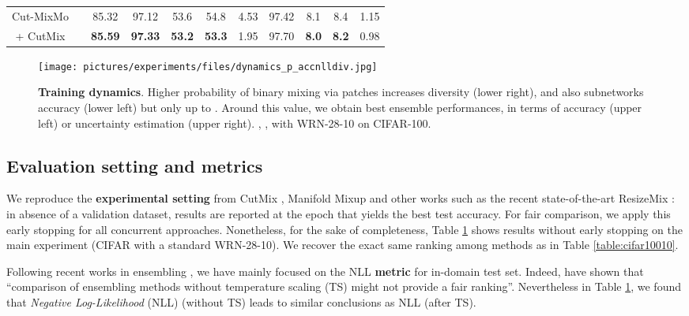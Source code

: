 \documentclass[10pt,twocolumn,letterpaper]{article}
\begin{document}
\begin{table}[!t]
{\begin{tabular}{c | c | c c c c c | c c c c}
        \multirow{1}{*}{Cut-MixMo} &  & 85.32 & 97.12 & 53.6& 54.8 & 4.53 & 97.42 & 8.1& 8.4 & 1.15 \\
        + CutMix & & \textbf{85.59} & \textbf{97.33} & \textbf{53.2} & \textbf{53.3} & 1.95 & 97.70 & \textbf{8.0} & \textbf{8.2} & 0.98 \\
        \bottomrule \end{tabular}}\label{table:cifar10010end}\end{table} \begin{figure*}[!ht]
\centering
\texttt{[image: pictures/experiments/files/dynamics\_p\_accnlldiv.jpg]}
\caption{\textbf{Training dynamics}. Higher probability  of binary mixing via patches increases diversity (lower right), and also subnetworks accuracy (lower left) but only up to . Around this value, we obtain best ensemble performances, in terms of accuracy (upper left) or uncertainty estimation (upper right). , ,  with WRN-28-10 on CIFAR-100.}
\label{fig:dynamicsp}
\end{figure*} 

\subsection{Evaluation setting and metrics}
\label{app:expeeval}
We reproduce the \textbf{experimental setting} from CutMix
\cite{yun2019cutmix}, Manifold Mixup \cite{manifoldmixup19} and other works such
as the recent state-of-the-art ResizeMix \cite{qin2020resizemix}: in absence of
a validation dataset, results are reported at the epoch that yields the best
test accuracy. For fair comparison, we apply this early stopping for all concurrent
approaches. Nonetheless, for the sake of completeness, Table \ref{table:cifar10010end}
shows results without early stopping on the main experiment (CIFAR with a
standard WRN-28-10). We recover the exact same ranking among methods as in Table \ref{table:cifar10010}.

Following recent works in ensembling \cite{chirkova2020deep,lobacheva2020power,rame2021dice}, we have mainly focused on the NLL \textbf{metric} for in-domain test set. Indeed, \cite{ashukha2020pitfalls} have shown that \enquote{comparison of \textelp{} ensembling methods without temperature scaling (TS) \cite{guo2017calibration} might not provide a fair ranking}. Nevertheless  in Table \ref{table:cifar10010end}, we found that \textit{Negative Log-Likelihood} (NLL) (without TS) leads to similar conclusions as NLL (after TS).
\end{document}

